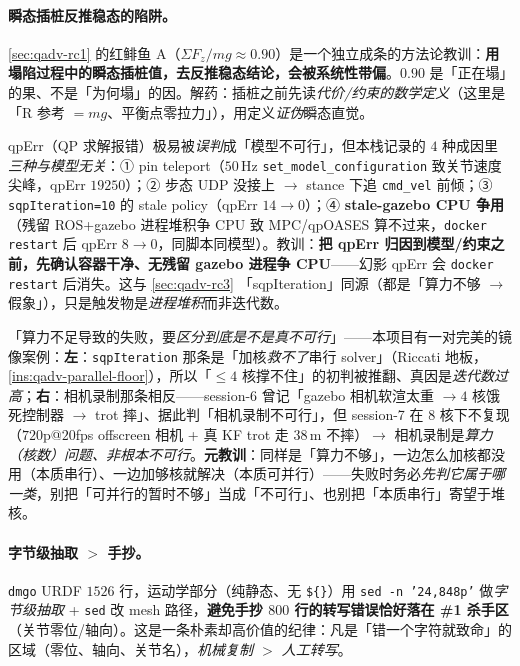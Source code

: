 \paragraph{瞬态插桩反推稳态的陷阱。}
\cref{sec:qadv-rc1} 的红鲱鱼 A（$\Sigma F_z/mg\approx0.90$）是一个独立成条的方法论教训：\textbf{用塌陷过程中的瞬态插桩值，去反推稳态结论，会被系统性带偏}。$0.90$ 是「正在塌」的果、不是「为何塌」的因。解药：插桩之前先读\emph{代价/约束的数学定义}（这里是「R 参考 $=mg$、平衡点零拉力」），用定义\emph{证伪}瞬态直觉。

\begin{insight}\label{ins:qadv-phantom-qperr}
qpErr（QP 求解报错）极易被\emph{误判}成「模型不可行」，但本栈记录的 $4$ 种成因里\emph{三种与模型无关}：① pin teleport（$50$\,Hz \texttt{set\_model\_configuration} 致关节速度尖峰，qpErr $19250$）；② 步态 UDP 没接上 $\to$ stance 下追 \texttt{cmd\_vel} 前倾；③ \texttt{sqpIteration=10} 的 stale policy（qpErr $14\to0$）；④ \textbf{stale-gazebo CPU 争用}（残留 ROS+gazebo 进程堆积争 CPU 致 MPC/qpOASES 算不过来，\texttt{docker restart} 后 qpErr $8\to0$，同脚本同模型）。教训：\textbf{把 qpErr 归因到模型/约束之前，先确认容器干净、无残留 gazebo 进程争 CPU}——幻影 qpErr 会 \texttt{docker restart} 后消失。这与 \cref{sec:qadv-rc3} 「sqpIteration」同源（都是「算力不够 $\to$ 假象」），只是触发物是\emph{进程堆积}而非迭代数。
\end{insight}

\begin{insight}\label{ins:qadv-mirror-pair}
「算力不足导致的失败，要\emph{区分到底是不是真不可行}」——本项目有一对完美的镜像案例：\textbf{左}：\texttt{sqpIteration} 那条是「加核\emph{救不了}串行 solver」（Riccati 地板，\cref{ins:qadv-parallel-floor}），所以「$\le4$ 核撑不住」的初判被推翻、真因是\emph{迭代数过高}；\textbf{右}：相机录制那条相反——session-6 曾记「gazebo 相机软渲太重 $\to4$ 核饿死控制器 $\to$ trot 摔」、据此判「相机录制不可行」，但 session-7 在 $8$ 核下不复现（$720$p@$20$fps offscreen 相机 + 真 KF trot 走 $38$\,m 不摔）$\to$ 相机录制是\emph{算力（核数）问题、非根本不可行}。\textbf{元教训}：同样是「算力不够」，一边怎么加核都没用（本质串行）、一边加够核就解决（本质可并行）——失败时务必\emph{先判它属于哪一类}，别把「可并行的暂时不够」当成「不可行」、也别把「本质串行」寄望于堆核。
\end{insight}

\paragraph{字节级抽取 $>$ 手抄。}
\texttt{dmgo} URDF $1526$ 行，运动学部分（纯静态、无 \texttt{\$\{\}}）用 \texttt{sed -n '24,848p'} 做\emph{字节级抽取} + \texttt{sed} 改 mesh 路径，\textbf{避免手抄 $800$ 行的转写错误恰好落在 \#1 杀手区}（关节零位/轴向）。这是一条朴素却高价值的纪律：凡是「错一个字符就致命」的区域（零位、轴向、关节名），\emph{机械复制 $>$ 人工转写}。

